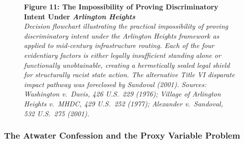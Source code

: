 \documentclass[
]{article}
\begin{document}
\begin{figure}[htbp]
{%
}
\caption*{\textbf{Figure 11: The Impossibility of Proving Discriminatory Intent Under \emph{Arlington Heights}}\\[0.3cm]
\emph{Decision flowchart illustrating the practical impossibility of proving discriminatory intent under the \emph{Arlington Heights} framework as applied to mid-century infrastructure routing. Each of the four evidentiary factors is either legally insufficient standing alone or functionally unobtainable, creating a hermetically sealed legal shield for structurally racist state action. The alternative Title VI disparate impact pathway was foreclosed by \emph{Sandoval} (2001). Sources: \emph{Washington v.\ Davis}, 426 U.S.\ 229 (1976); \emph{Village of Arlington Heights v.\ MHDC}, 429 U.S.\ 252 (1977); \emph{Alexander v.\ Sandoval}, 532 U.S.\ 275 (2001).}}
\label{fig:arlington-heights-flowchart}
\end{figure}

\subsubsection{\texorpdfstring{\textbf{The Atwater Confession and the
Proxy Variable
Problem}}{The Atwater Confession and the Proxy Variable Problem}}\label{the-atwater-confession-and-the-proxy-variable-problem}
\end{document}

